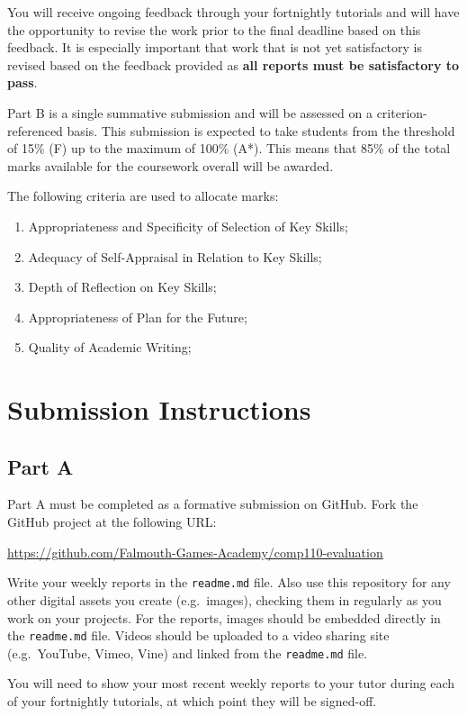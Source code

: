 \documentclass{../fal_assignment}
\begin{document}
You will receive ongoing feedback through your fortnightly tutorials and will have the opportunity to revise the work prior to the final deadline based on this feedback. It is especially important that work that is not yet satisfactory is revised based on the feedback provided as \textbf{all reports must be satisfactory to pass}.

Part B is a single summative submission and will be assessed on a criterion-referenced basis. This submission is expected to take students from the threshold of 15\% (F) up to the maximum of 100\% (A*). This means that 85\% of the total marks available for the coursework overall will be awarded.

The following criteria are used to allocate marks:

\begin{enumerate}[label=(\alph*)]
	\item Appropriateness and Specificity of Selection of Key Skills;
	\item Adequacy of Self-Appraisal in Relation to Key Skills;
	\item Depth of Reflection on Key Skills;
	\item Appropriateness of Plan for the Future;
	\item Quality of Academic Writing;
\end{enumerate}

\section*{Submission Instructions}

\subsection*{Part A}

Part A must be completed as a formative submission on GitHub. Fork the GitHub project at the following URL:

\indent \url{https://github.com/Falmouth-Games-Academy/comp110-evaluation}

Write your weekly reports in the \texttt{readme.md} file. Also use this repository for any other digital assets you create (e.g.\ images), checking them in regularly as you work on your projects. For the reports, images should be embedded directly in the \texttt{readme.md} file. Videos should be uploaded to a video sharing site (e.g.\ YouTube, Vimeo, Vine) and linked from the \texttt{readme.md} file.

You will need to show your most recent weekly reports to your tutor during each of your fortnightly tutorials, at which point they will be signed-off.
\end{document}
